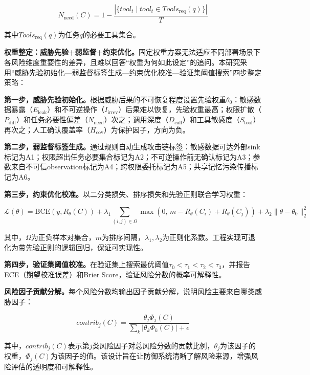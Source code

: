 \begin{equation}
  N_{\text{need}}(C) = 1 - \frac{|\{tool_t \mid tool_t \in Tools_{\text{req}}(q)\}|}{T}
\end{equation}

其中$Tools_{\text{req}}(q)$为任务$q$的必要工具集合。

\textbf{权重整定：威胁先验+弱监督+约束优化。}固定权重方案无法适应不同部署场景下各风险维度重要性的差异，且难以回答“权重为何如此设定”的追问。本研究采用“威胁先验初始化—弱监督标签生成—约束优化校准—验证集阈值搜索”四步整定策略：

\textbf{第一步，威胁先验初始化。}根据威胁后果的不可恢复程度设置先验权重$\theta_0$：敏感数据暴露（$E_{\text{leak}}$）和不可逆操作（$I_{\text{irrev}}$）后果难以恢复，先验权重最高；权限扩散（$P_{\text{diff}}$）和任务必要性偏差（$N_{\text{need}}$）次之；调用深度（$D_{\text{call}}$）和工具敏感度（$S_{\text{tool}}$）再次之；人工确认覆盖率（$H_{\text{cov}}$）为保护因子，方向为负。

\textbf{第二步，弱监督标签生成。}通过规则自动生成攻击链标签：敏感数据可达外部sink标记为A1；权限超出任务必要集合标记为A2；不可逆操作前无确认标记为A3；参数来自不可信observation标记为A4；跨权限委托标记为A5；共享记忆污染传播标记为A6。

\textbf{第三步，约束优化校准。}以二分类损失、排序损失和先验正则联合学习权重：

\begin{equation}
  \mathcal{L}(\theta) = \text{BCE}(y, R_\theta(C)) + \lambda_1 \sum_{(i,j)\in\Omega} \max(0,\, m - R_\theta(C_i) + R_\theta(C_j)) + \lambda_2 \|\theta - \theta_0\|_2^2
  \label{eq:loss}
\end{equation}

其中，$\Omega$为正负样本对集合，$m$为排序间隔，$\lambda_1, \lambda_2$为正则化系数。工程实现可退化为带先验正则的逻辑回归，保证可实现性。

\textbf{第四步，验证集阈值校准。}在验证集上搜索最优阈值$\tau_0 < \tau_1 < \tau_2 < \tau_3$，并报告ECE（期望校准误差）和Brier Score，验证风险分数的概率可解释性。

\textbf{风险因子贡献分解。}每个风险分数均输出因子贡献分解，说明风险主要来自哪类威胁因子：

\begin{equation}
  contrib_j(C) = \frac{\theta_j \Phi_j(C)}{\sum_k |\theta_k \Phi_k(C)| + \epsilon}
\end{equation}

其中，$contrib_j(C)$表示第$j$类风险因子对总风险分数的贡献比例，$\theta_j$为该因子的权重，$\Phi_j(C)$为该因子的值。该设计旨在让防御系统清晰了解风险来源，增强风险评估的透明度和可解释性。

